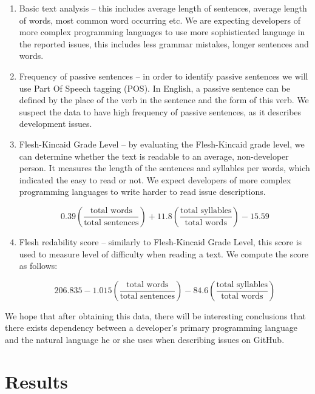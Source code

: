 \documentclass[]{article}
\begin{document}
\begin{enumerate}
	\item Basic text analysis -- this includes average length of sentences, average length of words, most common word occurring etc. We are expecting developers of more complex programming languages to use more sophisticated language in the reported issues, this includes less grammar mistakes, longer sentences and words.

	\item Frequency of passive sentences -- in order to identify passive sentences we will use Part Of Speech tagging (POS). In English, a passive sentence can be defined by the place of the verb in the sentence and the form of this verb. We suspect the data to have high frequency of passive sentences, as it describes development issues.

	\item Flesh-Kincaid Grade Level -- by evaluating the Flesh-Kincaid grade level, we can determine whether the text is readable to an average, non-developer person. It measures the length of the sentences and syllables per words, which indicated the easy to read or not. We expect developers of more complex programming languages to write harder to read issue descriptions.

	      \[0.39\left(\frac{\text{total words}}{\text{total sentences}}\right) + 11.8\left(\frac{\text{total syllables}}{\text{total words}}\right) - 15.59\]

	\item Flesh redability score -- similarly to Flesh-Kincaid Grade Level, this score is used to measure level of difficulty when reading a text. We compute the score as follows:

	      \[206.835 - 1.015\left(\frac{\text{total words}}{\text{total sentences}}\right) - 84.6\left(\frac{\text{total syllables}}{\text{total words}}\right)\]
\end{enumerate}

We hope that after obtaining this data, there will be interesting conclusions that there exists dependency between a developer's primary programming language and the natural language he or she uses when describing issues on GitHub.

\section{Results}
\end{document}
